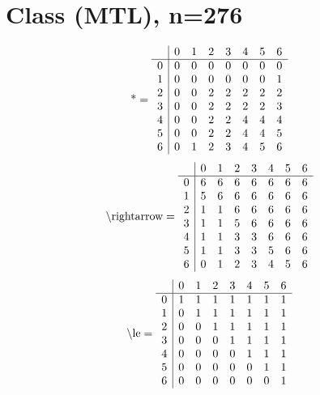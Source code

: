\documentclass[11pt]{article}
\begin{document}
\section{Class (MTL), n=276}
\[\text{*} = 
\begin{array}{r | r r r r r r r}
 & 0 & 1 & 2 & 3 & 4 & 5 & 6 \\ \hline
0 & 0 & 0 & 0 & 0 & 0 & 0 & 0 \\
1 & 0 & 0 & 0 & 0 & 0 & 0 & 1 \\
2 & 0 & 0 & 2 & 2 & 2 & 2 & 2 \\
3 & 0 & 0 & 2 & 2 & 2 & 2 & 3 \\
4 & 0 & 0 & 2 & 2 & 4 & 4 & 4 \\
5 & 0 & 0 & 2 & 2 & 4 & 4 & 5 \\
6 & 0 & 1 & 2 & 3 & 4 & 5 & 6 \\
\end{array}
\]
\[\text{\textbackslash rightarrow} = 
\begin{array}{r | r r r r r r r}
 & 0 & 1 & 2 & 3 & 4 & 5 & 6 \\ \hline
0 & 6 & 6 & 6 & 6 & 6 & 6 & 6 \\
1 & 5 & 6 & 6 & 6 & 6 & 6 & 6 \\
2 & 1 & 1 & 6 & 6 & 6 & 6 & 6 \\
3 & 1 & 1 & 5 & 6 & 6 & 6 & 6 \\
4 & 1 & 1 & 3 & 3 & 6 & 6 & 6 \\
5 & 1 & 1 & 3 & 3 & 5 & 6 & 6 \\
6 & 0 & 1 & 2 & 3 & 4 & 5 & 6 \\
\end{array}
\]
\[\text{\textbackslash le} = 
\begin{array}{r | r r r r r r r}
 & 0 & 1 & 2 & 3 & 4 & 5 & 6 \\ \hline
0 & 1 & 1 & 1 & 1 & 1 & 1 & 1 \\
1 & 0 & 1 & 1 & 1 & 1 & 1 & 1 \\
2 & 0 & 0 & 1 & 1 & 1 & 1 & 1 \\
3 & 0 & 0 & 0 & 1 & 1 & 1 & 1 \\
4 & 0 & 0 & 0 & 0 & 1 & 1 & 1 \\
5 & 0 & 0 & 0 & 0 & 0 & 1 & 1 \\
6 & 0 & 0 & 0 & 0 & 0 & 0 & 1 \\
\end{array}
\]
\end{document}
